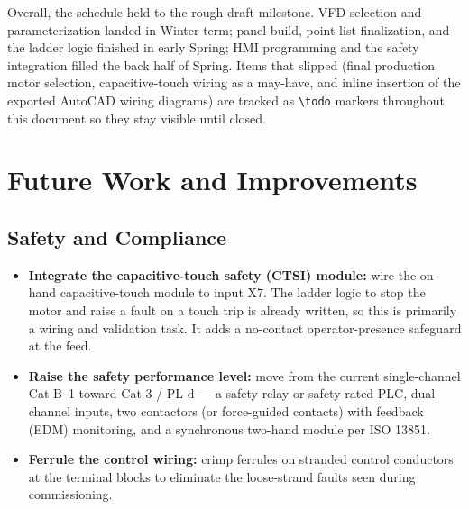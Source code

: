 \documentclass[hidelinks,12pt]{article}
\begin{document}
Overall, the schedule held to the rough-draft milestone. VFD selection and
parameterization landed in Winter term; panel build, point-list finalization,
and the ladder logic finished in early Spring; HMI programming and the safety
integration filled the back half of Spring. Items that slipped (final
production motor selection, capacitive-touch wiring as a may-have, and
inline insertion of the exported AutoCAD wiring diagrams) are tracked as
\texttt{\textbackslash todo} markers throughout this document so they stay
visible until closed.

\section{Future Work and Improvements}

\subsection{Safety and Compliance}
\begin{itemize}
    \item \textbf{Integrate the capacitive-touch safety (CTSI) module:} wire the on-hand capacitive-touch module to input X7. The ladder logic to stop the motor and raise a fault on a touch trip is already written, so this is primarily a wiring and validation task. It adds a no-contact operator-presence safeguard at the feed.
    \item \textbf{Raise the safety performance level:} move from the current single-channel Cat B--1 toward Cat 3 / PL d --- a safety relay or safety-rated PLC, dual-channel inputs, two contactors (or force-guided contacts) with feedback (EDM) monitoring, and a synchronous two-hand module per ISO 13851.
    \item \textbf{Ferrule the control wiring:} crimp ferrules on stranded control conductors at the terminal blocks to eliminate the loose-strand faults seen during commissioning.
\end{itemize}
\end{document}
